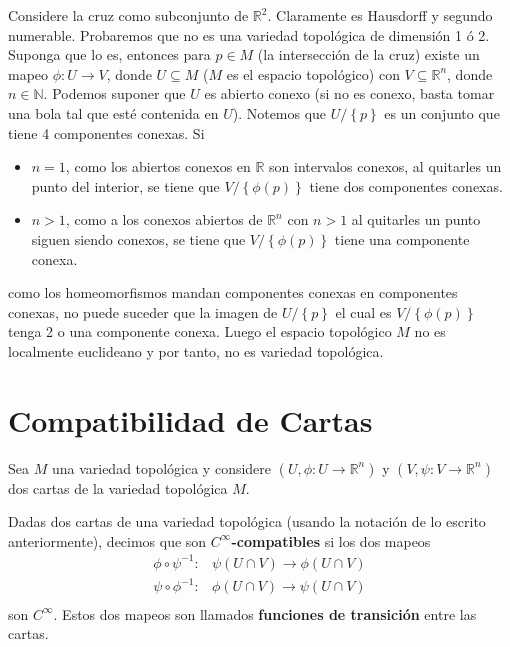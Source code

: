 \documentclass[12pt]{report}
\theoremstyle{largebreak}
\begin{document}
    \begin{exa}
        Considere la cruz como subconjunto de $\mathbb{R}^2$. Claramente es Hausdorff y segundo numerable. Probaremos que no es una variedad topológica de dimensión 1 ó 2. Suponga que lo es, entonces para $p\in M$ (la intersección de la cruz) existe un mapeo $\phi:U\rightarrow V$, donde $U\subseteq M$ ($M$ es el espacio topológico) con $V\subseteq \mathbb{R}^n$, donde $n\in\mathbb{N}$. Podemos suponer que $U$ es abierto conexo (si no es conexo, basta tomar una bola tal que esté contenida en $U$). Notemos que $U/\left\{p\right\}$ es un conjunto que tiene 4 componentes conexas. Si
        \begin{itemize}
            \item $n=1$, como los abiertos conexos en $\mathbb{R}$ son intervalos conexos, al quitarles un punto del interior, se tiene que $V/\left\{\phi(p)\right\}$ tiene dos componentes conexas.
            \item $n>1$, como a los conexos abiertos de $\mathbb{R}^n$ con $n>1$ al quitarles un punto siguen siendo conexos, se tiene que $V/\left\{\phi(p)\right\}$ tiene una componente conexa.
        \end{itemize}
        como los homeomorfismos mandan componentes conexas en componentes conexas, no puede suceder que la imagen de $U/\left\{p\right\}$ el cual es $V/\left\{\phi(p)\right\}$ tenga 2 o una componente conexa. Luego el espacio topológico $M$ no es localmente euclideano y por tanto, no es variedad topológica.
    \end{exa}

    \section{Compatibilidad de Cartas}

    Sea $M$ una variedad topológica y considere $(U, \phi:U\rightarrow \mathbb{R}^n)$ y $(V, \psi:V\rightarrow \mathbb{R}^n)$ dos cartas de la variedad topológica $M$.

    \begin{mydef}
        Dadas dos cartas de una variedad topológica (usando la notación de lo escrito anteriormente), decimos que son \textbf{$C^{\infty}$-compatibles} si los dos mapeos
        \begin{equation}
            \begin{split}
                \phi\circ\psi^{-1}:&\psi(U\cap V)\rightarrow \phi(U\cap V)\\
                \psi\circ\phi^{-1}:&\phi(U\cap V)\rightarrow \psi(U\cap V)\\
            \end{split} 
        \end{equation}
        son $C^{\infty}$. Estos dos mapeos son llamados \textbf{funciones de transición} entre las cartas.
    \end{mydef}
\end{document}
